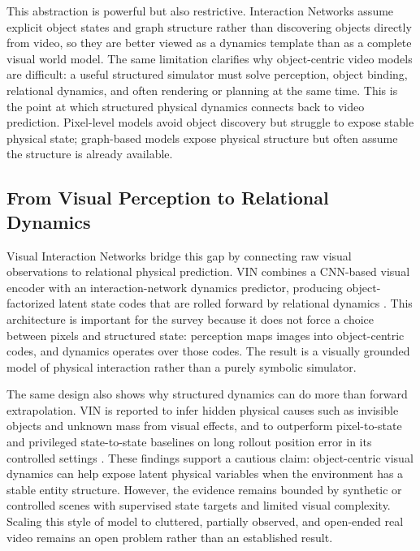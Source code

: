 This abstraction is powerful but also restrictive. Interaction Networks assume explicit object states and graph structure rather than discovering objects directly from video, so they are better viewed as a dynamics template than as a complete visual world model. The same limitation clarifies why object-centric video models are difficult: a useful structured simulator must solve perception, object binding, relational dynamics, and often rendering or planning at the same time. This is the point at which structured physical dynamics connects back to video prediction. Pixel-level models avoid object discovery but struggle to expose stable physical state; graph-based models expose physical structure but often assume the structure is already available.

\subsection{From Visual Perception to Relational Dynamics}

Visual Interaction Networks bridge this gap by connecting raw visual observations to relational physical prediction. VIN combines a CNN-based visual encoder with an interaction-network dynamics predictor, producing object-factorized latent state codes that are rolled forward by relational dynamics \cite{watters2017_visual_interaction_networks_prov}. This architecture is important for the survey because it does not force a choice between pixels and structured state: perception maps images into object-centric codes, and dynamics operates over those codes. The result is a visually grounded model of physical interaction rather than a purely symbolic simulator.

The same design also shows why structured dynamics can do more than forward extrapolation. VIN is reported to infer hidden physical causes such as invisible objects and unknown mass from visual effects, and to outperform pixel-to-state and privileged state-to-state baselines on long rollout position error in its controlled settings \cite{watters2017_visual_interaction_networks_prov}. These findings support a cautious claim: object-centric visual dynamics can help expose latent physical variables when the environment has a stable entity structure. However, the evidence remains bounded by synthetic or controlled scenes with supervised state targets and limited visual complexity. Scaling this style of model to cluttered, partially observed, and open-ended real video remains an open problem rather than an established result.

